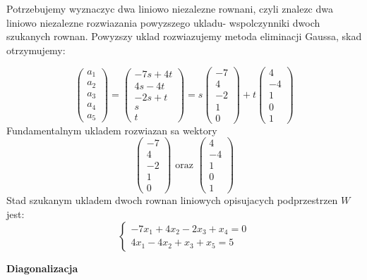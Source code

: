 \documentclass{article}
\begin{document}
Potrzebujemy wyznaczyc dwa liniowo niezalezne rownani, czyli znalezc dwa liniowo niezalezne rozwiazania powyzszego ukladu- wspolczynniki dwoch szukanych rownan. Powyzszy uklad rozwiazujemy metoda eliminacji Gaussa, skad otrzymujemy:

$$
\begin{pmatrix} a_{1} \\ a_{2} \\ a_{3} \\ a_{4} \\ a_{5} \end{pmatrix} = 
\begin{pmatrix} -7s + 4t \\ 4s - 4t \\ -2s + t \\ s \\ t \end{pmatrix} =
s \begin{pmatrix} -7 \\ 4 \\ -2 \\ 1 \\ 0 \end{pmatrix} +
t \begin{pmatrix} 4 \\ -4 \\ 1 \\ 0 \\ 1 \end{pmatrix}
$$
Fundamentalnym ukladem rozwiazan sa wektory $$\begin{pmatrix} -7 \\ 4 \\ -2 \\ 1 \\ 0 \end{pmatrix} \text{ oraz } \begin{pmatrix} 4 \\ -4 \\ 1 \\ 0 \\ 1 \end{pmatrix}$$ Stad szukanym ukladem dwoch rownan liniowych opisujacych podprzestrzen $W$ jest:
$$
\begin{cases}
-7x_{1} + 4x_{2} - 2x_{3} + x_{4} = 0 \\
4x_{1} - 4x_{2} + x_{3} + x_{5} = 5
\end{cases}
$$

\vspace{10mm}
\textbf{Diagonalizacja}
\end{document}
